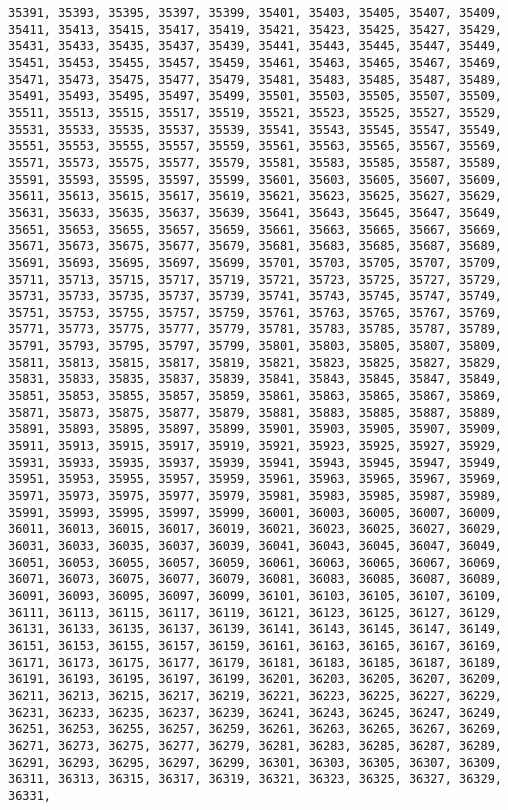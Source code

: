 \documentclass[11pt]{article}
\begin{document}
\begin{Verbatim}[commandchars=\\\{\}]
35391, 35393, 35395, 35397, 35399, 35401, 35403, 35405, 35407, 35409, 35411, 35413, 35415, 35417, 35419, 35421, 35423, 35425, 35427, 35429, 35431, 35433, 35435, 35437, 35439, 35441, 35443, 35445, 35447, 35449, 35451, 35453, 35455, 35457, 35459, 35461, 35463, 35465, 35467, 35469, 35471, 35473, 35475, 35477, 35479, 35481, 35483, 35485, 35487, 35489, 35491, 35493, 35495, 35497, 35499, 35501, 35503, 35505, 35507, 35509, 35511, 35513, 35515, 35517, 35519, 35521, 35523, 35525, 35527, 35529, 35531, 35533, 35535, 35537, 35539, 35541, 35543, 35545, 35547, 35549, 35551, 35553, 35555, 35557, 35559, 35561, 35563, 35565, 35567, 35569, 35571, 35573, 35575, 35577, 35579, 35581, 35583, 35585, 35587, 35589, 35591, 35593, 35595, 35597, 35599, 35601, 35603, 35605, 35607, 35609, 35611, 35613, 35615, 35617, 35619, 35621, 35623, 35625, 35627, 35629, 35631, 35633, 35635, 35637, 35639, 35641, 35643, 35645, 35647, 35649, 35651, 35653, 35655, 35657, 35659, 35661, 35663, 35665, 35667, 35669, 35671, 35673, 35675, 35677, 35679, 35681, 35683, 35685, 35687, 35689, 35691, 35693, 35695, 35697, 35699, 35701, 35703, 35705, 35707, 35709, 35711, 35713, 35715, 35717, 35719, 35721, 35723, 35725, 35727, 35729, 35731, 35733, 35735, 35737, 35739, 35741, 35743, 35745, 35747, 35749, 35751, 35753, 35755, 35757, 35759, 35761, 35763, 35765, 35767, 35769, 35771, 35773, 35775, 35777, 35779, 35781, 35783, 35785, 35787, 35789, 35791, 35793, 35795, 35797, 35799, 35801, 35803, 35805, 35807, 35809, 35811, 35813, 35815, 35817, 35819, 35821, 35823, 35825, 35827, 35829, 35831, 35833, 35835, 35837, 35839, 35841, 35843, 35845, 35847, 35849, 35851, 35853, 35855, 35857, 35859, 35861, 35863, 35865, 35867, 35869, 35871, 35873, 35875, 35877, 35879, 35881, 35883, 35885, 35887, 35889, 35891, 35893, 35895, 35897, 35899, 35901, 35903, 35905, 35907, 35909, 35911, 35913, 35915, 35917, 35919, 35921, 35923, 35925, 35927, 35929, 35931, 35933, 35935, 35937, 35939, 35941, 35943, 35945, 35947, 35949, 35951, 35953, 35955, 35957, 35959, 35961, 35963, 35965, 35967, 35969, 35971, 35973, 35975, 35977, 35979, 35981, 35983, 35985, 35987, 35989, 35991, 35993, 35995, 35997, 35999, 36001, 36003, 36005, 36007, 36009, 36011, 36013, 36015, 36017, 36019, 36021, 36023, 36025, 36027, 36029, 36031, 36033, 36035, 36037, 36039, 36041, 36043, 36045, 36047, 36049, 36051, 36053, 36055, 36057, 36059, 36061, 36063, 36065, 36067, 36069, 36071, 36073, 36075, 36077, 36079, 36081, 36083, 36085, 36087, 36089, 36091, 36093, 36095, 36097, 36099, 36101, 36103, 36105, 36107, 36109, 36111, 36113, 36115, 36117, 36119, 36121, 36123, 36125, 36127, 36129, 36131, 36133, 36135, 36137, 36139, 36141, 36143, 36145, 36147, 36149, 36151, 36153, 36155, 36157, 36159, 36161, 36163, 36165, 36167, 36169, 36171, 36173, 36175, 36177, 36179, 36181, 36183, 36185, 36187, 36189, 36191, 36193, 36195, 36197, 36199, 36201, 36203, 36205, 36207, 36209, 36211, 36213, 36215, 36217, 36219, 36221, 36223, 36225, 36227, 36229, 36231, 36233, 36235, 36237, 36239, 36241, 36243, 36245, 36247, 36249, 36251, 36253, 36255, 36257, 36259, 36261, 36263, 36265, 36267, 36269, 36271, 36273, 36275, 36277, 36279, 36281, 36283, 36285, 36287, 36289, 36291, 36293, 36295, 36297, 36299, 36301, 36303, 36305, 36307, 36309, 36311, 36313, 36315, 36317, 36319, 36321, 36323, 36325, 36327, 36329, 36331, 
\end{Verbatim}
\end{document}
